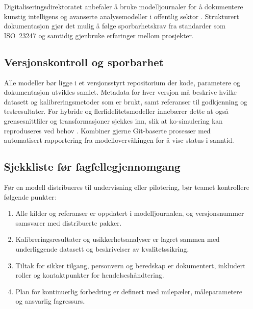 Digitaliseringsdirektoratet anbefaler å bruke modelljournaler for å dokumentere kunstig intelligens og avanserte analysemodeller
i offentlig sektor \citep{digdir2023modelljournal}. Strukturert dokumentasjon gjør det mulig å følge sporbarhetskrav fra
standarder som ISO~23247 og samtidig gjenbruke erfaringer mellom prosjekter.

\subsection{Versjonskontroll og sporbarhet}
Alle modeller bør ligge i et versjonsstyrt repositorium der kode, parametere og dokumentasjon utvikles samlet. Metadata for hver versjon må beskrive hvilke datasett og kalibreringsmetoder som er brukt, samt referanser til godkjenning og testresultater. For hybride og flerfidelitetsmodeller innebærer dette at også grensesnittfiler og transformasjoner sjekkes inn, slik at ko-simulering kan reproduseres ved behov \citep{boschert2018digital}. Kombiner gjerne Git-baserte prosesser med automatisert rapportering fra modellovervåkingen for å vise status i sanntid.

\subsection{Sjekkliste før fagfellegjennomgang}
Før en modell distribueres til undervisning eller pilotering, bør teamet kontrollere følgende punkter:
\begin{enumerate}
    \item Alle kilder og referanser er oppdatert i modelljournalen, og versjonsnummer samsvarer med distribuerte pakker.
    \item Kalibreringsresultater og usikkerhetsanalyser er lagret sammen med underliggende datasett og beskrivelser av kvalitetssikring.
    \item Tiltak for sikker tilgang, personvern og beredskap er dokumentert, inkludert roller og kontaktpunkter for hendelseshåndtering.
    \item Plan for kontinuerlig forbedring er definert med milepæler, måleparametere og ansvarlig fagressurs.
\end{enumerate}

